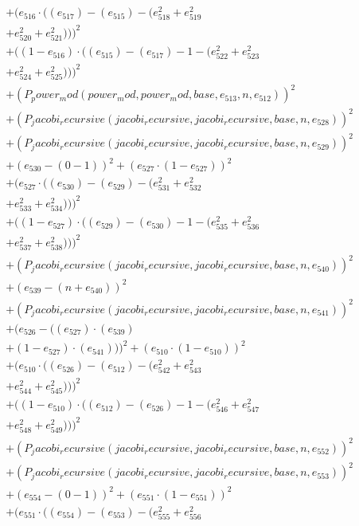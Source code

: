 \documentclass[10pt, a4paper]{article}
\begin{document}
\begin{align*}
& + (e_{516}  \cdot  ((e_{517}) - (e_{515}) - (e_{518}^{2} + e_{519}^{2} \\
& + e_{520}^{2} + e_{521}^{2})))^{2} \\
& + ((1 - e_{516})  \cdot  ((e_{515}) - (e_{517}) - 1 - (e_{522}^{2} + e_{523}^{2} \\
& + e_{524}^{2} + e_{525}^{2})))^{2} \\
& + (P_power_mod(power_mod, power_mod, base, e_{513}, n, e_{512}))^{2} \\
& + (P_jacobi_recursive(jacobi_recursive, jacobi_recursive, base, n, e_{528}))^{2} \\
& + (P_jacobi_recursive(jacobi_recursive, jacobi_recursive, base, n, e_{529}))^{2} \\
& + (e_{530} - (0 - 1))^{2} + (e_{527}  \cdot  (1 - e_{527}))^{2} \\
& + (e_{527}  \cdot  ((e_{530}) - (e_{529}) - (e_{531}^{2} + e_{532}^{2} \\
& + e_{533}^{2} + e_{534}^{2})))^{2} \\
& + ((1 - e_{527})  \cdot  ((e_{529}) - (e_{530}) - 1 - (e_{535}^{2} + e_{536}^{2} \\
& + e_{537}^{2} + e_{538}^{2})))^{2} \\
& + (P_jacobi_recursive(jacobi_recursive, jacobi_recursive, base, n, e_{540}))^{2} \\
& + (e_{539} - (n + e_{540}))^{2} \\
& + (P_jacobi_recursive(jacobi_recursive, jacobi_recursive, base, n, e_{541}))^{2} \\
& + (e_{526} - ((e_{527})  \cdot  (e_{539}) \\
& + (1 - e_{527})  \cdot  (e_{541})))^{2} + (e_{510}  \cdot  (1 - e_{510}))^{2} \\
& + (e_{510}  \cdot  ((e_{526}) - (e_{512}) - (e_{542}^{2} + e_{543}^{2} \\
& + e_{544}^{2} + e_{545}^{2})))^{2} \\
& + ((1 - e_{510})  \cdot  ((e_{512}) - (e_{526}) - 1 - (e_{546}^{2} + e_{547}^{2} \\
& + e_{548}^{2} + e_{549}^{2})))^{2} \\
& + (P_jacobi_recursive(jacobi_recursive, jacobi_recursive, base, n, e_{552}))^{2} \\
& + (P_jacobi_recursive(jacobi_recursive, jacobi_recursive, base, n, e_{553}))^{2} \\
& + (e_{554} - (0 - 1))^{2} + (e_{551}  \cdot  (1 - e_{551}))^{2} \\
& + (e_{551}  \cdot  ((e_{554}) - (e_{553}) - (e_{555}^{2} + e_{556}^{2} \\

\end{align*}
\end{document}
